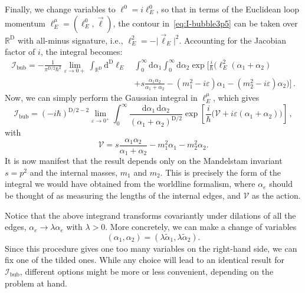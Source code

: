 \documentclass[12pt]{article}
\numberwithin{figure}{section}
\def \be {\begin{equation}}
\def \ee {\end{equation}}
\def \nn {\nonumber}
\def \R {\mathbb{R}}
\def \D {\mathrm{D}}
\def \d {\mathrm{d}}
\def \eps {\varepsilon}
\def \V {\mathcal{V}}
\def \I {\mathcal{I}}
\def \bubble {\mathrm{bub}}
\begin{document}
	Finally, we change variables to $\ell^0 = i \ell^0_E$, so that in terms of the Euclidean loop momentum $\ell^\mu_E = (\ell^0_E, \vec{\ell})$, the contour in~\eqref{eq:I-bubble3p5} can be taken over $\mathbb{R}^{\D}$ with all-minus signature, i.e., $\ell_E^2 = -\vert \vec{\ell}_E\vert^2$. Accounting for the Jacobian factor of $i$, the integral becomes:
	\begin{align}\label{eq:I-bubble3p6}
		\I_\bubble = - \frac{1}{\pi^{\D/2} \hbar^2} \lim_{\eps \to 0+} \int_{\R^{\D}} \d^\D \ell_E \,
		& \int_0^\infty
		\d\alpha_1 \int_0^\infty \d \alpha_2 \exp\bigg[ \frac{i}{\hbar} \Big( \ell_E^2 (\alpha_1 {+} \alpha_2) \\
		& + s \frac{\alpha_1 \alpha_2}{\alpha_1+\alpha_2}- (m_1^2 - i\eps) \alpha_1 - (m_2^2 - i\eps) \alpha_2  \Big) \bigg]\,.\nn
	\end{align}
	Now, we can simply perform the Gaussian integral in $\ell_E^\mu$, which gives
	\be\label{eq:I-bubble2}
	\I_\bubble = \left(-i \hbar \right)^{\D/2-2} \lim_{\eps \to 0^+} \int_0^\infty \frac{\d\alpha_1\, \d\alpha_2}{(\alpha_1 {+} \alpha_2)^{\D/2}} \exp \left[ \frac{i}{\hbar}\Big(\V + i\eps (\alpha_1 {+} \alpha_2)\Big)\right] \,,
	\ee
	with
	\be
	\V = s\frac{\alpha_1 \alpha_2}{\alpha_1 {+} \alpha_2} - m_1^2 \alpha_1 - m_2^2 \alpha_2.
	\ee
	It is now manifest that the result depends only on the Mandelstam invariant $s = p^2$ and the internal masses, $m_1$ and $m_2$. This is precisely the form of the integral we would have obtained from the worldline formalism, where $\alpha_e$ should be thought of as measuring the lengths of the internal edges, and $\V$ as the action.
	
	Notice that the above integrand transforms covariantly under dilations of all the edges, $\alpha_e \to \lambda \alpha_e$ with $\lambda > 0$. More concretely, we can make a change of variables
	\be\label{eq:alpha-tilde}
	(\alpha_1, \alpha_2) = (\lambda \tilde{\alpha}_1, \lambda \tilde{\alpha}_2).
	\ee
	Since this procedure gives one too many variables on the right-hand side, we can fix one of the tilded ones. While any choice will lead to an identical result for $\I_{\bubble}$, different options might be more or less convenient, depending on the problem at hand.
	
\end{document}
